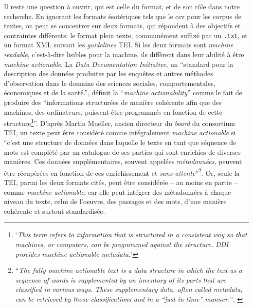 Il reste une question à ouvrir, qui est celle du format, et de son rôle dans notre recherche. En ignorant les formats ésotériques tels que le \acrshort{csv} pour les corpus de textes, on peut se concentrer sur deux formats, qui répondent à des objectifs et contraintes différents: le format plein texte, communément suffixé par un \texttt{.txt}, et un format XML suivant les \textit{guidelines} TEI. Si les deux formats sont \textit{machine readable}, c'est-à-dire lisibles pour la machine, ils diffèrent dans leur abilité à être \textit{machine actionable}. La \textit{Data Documentation Initiative}, un \enquote{standard pour la description des données produites par les enquêtes et autres méthodes d'observation dans le domaine des sciences sociales, comportementales, économiques et de la santé.}, définit la \enquote{\textit{machine actionability}} comme le fait de produire des \enquote{informations structurées de manière cohérente afin que des machines, des ordinateurs, puissent être programmés en fonction de cette structure\footnote{\enquote{\textit{This term refers to information that is structured in a consistent way so that machines, or computers, can be programmed against the structure. DDI provides machine-actionable metadata.}}\textcite{noauthor_machine_actionable_nodate}}}. D'après Martin Mueller, ancien directeur du \textit{board} du consortium TEI, un texte peut être considéré comme intégralement \textit{machine actionable} si \enquote{c'est une structure de données dans laquelle le texte en tant que séquence de mots est complété par un catalogue de ses parties qui sont enrichies de diverses manières. Ces données supplémentaires, souvent appelées \textit{métadonnées}, peuvent être récupérées en fonction de ces enrichissement et \textit{sans attente}}\footnote{\enquote{\textit{The fully machine actionable text is a data structure in which the text as a sequence of words is supplemented by an inventory of its parts that are classified in various ways. These supplementary data, often called metadata, can be retrieved by those classifications and in a “just in time” manner.}}, \textcite{mueller_shakespeare_2014}}. Or, seule la TEI, parmi les deux formats cités, peut être considérée -- au moins en partie -- comme \textit{machine actionable}, car elle peut intégrer des métadonnées à chaque niveau du texte, celui de l'oeuvre, des passages et des mots, d'une manière cohérente et surtout standardisée.

